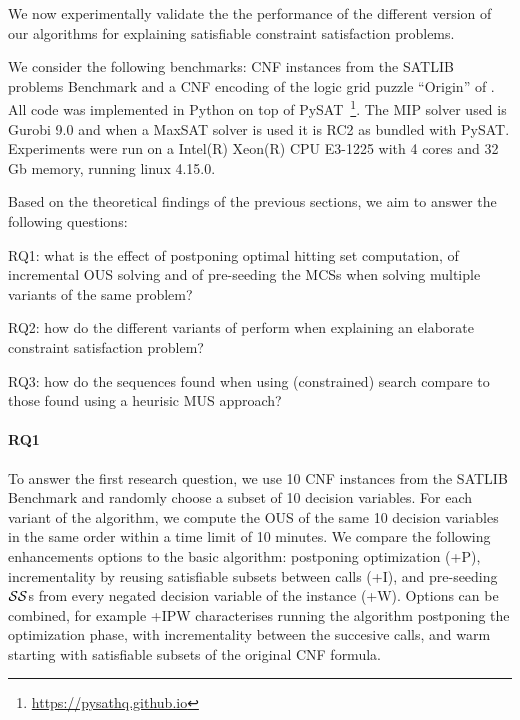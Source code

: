 We now experimentally validate the the performance of the different version of our algorithms for explaining satisfiable constraint satisfaction problems.

We consider the following benchmarks: CNF instances from the SATLIB problems Benchmark \cite{hoos2000satlib} and a CNF encoding of the logic grid puzzle ``Origin'' of \citet{ecai/BogaertsGCG20}. All code was implemented in Python on top of %
PySAT~\footnote{\url{https://pysathq.github.io}}. The MIP solver used is Gurobi 9.0 and when a MaxSAT solver is used it is RC2 as bundled with PySAT. Experiments were run on a Intel(R) Xeon(R) CPU E3-1225 with 4 cores and 32 Gb memory, running linux 4.15.0.

Based on the theoretical findings of the previous sections, we aim to answer the following questions:
\begin{compactitem}
\item RQ1: what is the effect of postponing optimal hitting set computation, of incremental OUS solving and of pre-seeding the MCSs when solving multiple variants of the same problem?
\item RQ2: how do the different variants of \omus perform when explaining an elaborate constraint satisfaction problem?
\item RQ3: how do the sequences found when using (constrained) \omus search compare to those found using a heurisic MUS approach?
\end{compactitem}


\paragraph{RQ1}
To answer the first research question, we use 10 CNF instances from the SATLIB Benchmark and randomly choose a subset of 10 decision variables. For each variant of the algorithm, we compute the OUS of the same 10 decision variables in the same order within a time limit of 10 minutes. We compare the following enhancements options to the basic \omus algorithm: postponing optimization (+P), incrementality by reusing satisfiable subsets between \omus calls (+I), and pre-seeding $\mathcal{SS}$s from every negated decision variable of the instance (+W). Options can be combined, for example \omus+IPW characterises running the \omus algorithm postponing the optimization phase, with incrementality between the succesive calls, and warm starting with satisfiable subsets of the original CNF formula.

